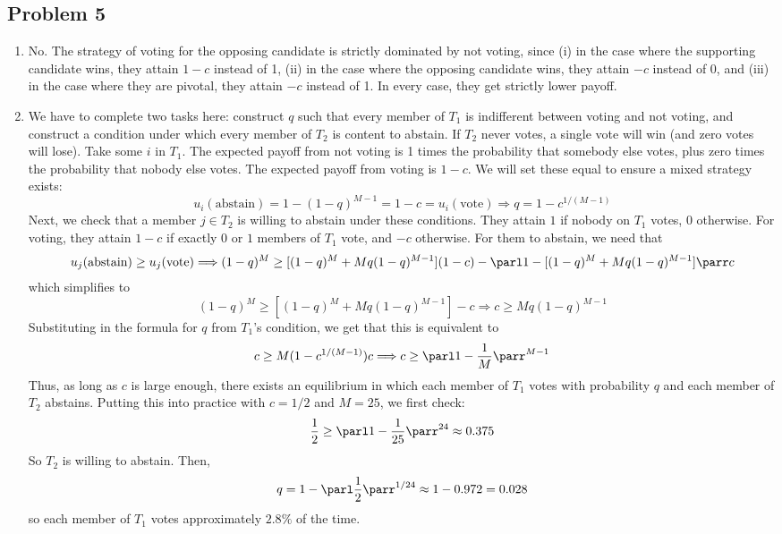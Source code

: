 \documentclass[10pt]{article}
\begin{document}
\subsection*{Problem 5}

\begin{enumerate}
	\item No. The strategy of voting for the opposing candidate is strictly dominated by not voting, since (i) in the case where the supporting candidate wins, they attain $1-c$ instead of 1, (ii) in the case where the opposing candidate wins, they attain $-c$ instead of 0, and (iii) in the case where they are pivotal, they attain $-c$ instead of 1. In every case, they get strictly lower payoff.
	\item We have to complete two tasks here: construct $q$ such that every member of $T_1$ is indifferent between voting and not voting, and construct a condition under which every member of $T_2$ is content to abstain. If $T_2$ never votes, a single vote will win (and zero votes will lose). Take some $i$ in $T_1$. The expected payoff from not voting is 1 times the probability that somebody else votes, plus zero times the probability that nobody else votes. The expected payoff from voting is $1-c$. We will set these equal to ensure a mixed strategy exists: \[u_i(\text{abstain}) = 1 - (1-q)^{M-1} = 1-c = u_i(\text{vote}) \Longrightarrow q = 1 - c^{1/(M-1)}\]Next, we check that a member $j \in T_2$ is willing to abstain under these conditions. They attain $1$ if nobody on $T_1$ votes, $0$ otherwise. For voting, they attain $1-c$ if exactly $0$ or $1$ members of $T_1$ vote, and $-c$ otherwise. For them to abstain, we need that \[u_j(\text{abstain}) \ge u_j(\text{vote}) \Longrightarrow (1-q)^M \ge [(1-q)^M + Mq(1-q)^{M-1}](1-c) -  \parl1-[(1-q)^M + Mq(1-q)^{M-1}]\parr c\]which simplifies to\[(1-q)^M \ge [(1-q)^M + Mq(1-q)^{M-1}]-c \Longrightarrow c \ge Mq(1-q)^{M-1}\]Substituting in the formula for $q$ from $T_1$'s condition, we get that this is equivalent to \[c \ge M(1-c^{1/(M-1)})c \Longrightarrow c \ge \parl 1 - \frac{1}{M}\parr^{M-1}\]Thus, as long as $c$ is large enough, there exists an equilibrium in which each member of $T_1$ votes with probability $q$ and each member of $T_2$ abstains. Putting this into practice with $c = 1/2$ and $M = 25$, we first check:\[\frac{1}{2} \ge \parl 1 - \frac{1}{25}\parr^{24} \approx 0.375\]So $T_2$ is willing to abstain. Then,\[q = 1 - \parl\frac{1}{2}\parr^{1/24} \approx 1 - 0.972 = 0.028 \]so each member of $T_1$ votes approximately $2.8\%$ of the time.

\end{enumerate}
\end{document}
